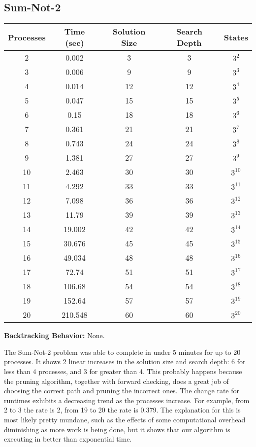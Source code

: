 \subsection{Sum-Not-2}
\begin{center}
\begin{tabular}{|c|c|c|c|c|}
\hline
 Processes & Time (sec) & Solution Size & Search Depth & States \\
\hline
 2 & 0.002 & 3 & 3 & $3^{2}$               \\
 3 & 0.006 & 9 & 9 & $3^{3}$               \\
 4 & 0.014 & 12 & 12 & $3^{4}$             \\
 5 & 0.047 & 15 & 15 & $3^{5}$             \\
 6 & 0.15 & 18 & 18 & $3^{6}$              \\
 7 & 0.361 & 21 & 21 & $3^{7}$              \\
 8 & 0.743 & 24 & 24 & $3^{8}$             \\
 9 & 1.381 & 27 & 27 & $3^{9}$            \\
 10 & 2.463 & 30 & 30 & $3^{10}$          \\
 11 & 4.292 & 33 & 33 & $3^{11}$          \\
 12 & 7.098 & 36 & 36 & $3^{12}$          \\
 13 & 11.79 & 39 & 39 & $3^{13}$          \\
 14 & 19.002 & 42 & 42 & $3^{14}$         \\
 15 & 30.676 & 45 & 45 & $3^{15}$         \\
 16 & 49.034 & 48 & 48 & $3^{16}$         \\
 17 & 72.74 & 51 & 51 & $3^{17}$          \\
 18 & 106.68 & 54 & 54 & $3^{18}$          \\
 19 & 152.64 & 57 & 57 & $3^{19}$         \\
 20 & 210.548 & 60 & 60 & $3^{20}$        \\
\hline
\end{tabular}
\end{center}

{\bf Backtracking Behavior:} None.

The Sum-Not-2 problem was able to complete in under 5 minutes for up to 20 processes.  It shows 2 linear
increases in the solution size and search depth: 6 for less than 4 processes, and 3 for greater than
4.  This probably happens because the pruning algorithm, together with forward checking, does a great job
of choosing the correct path and pruning the incorrect ones.  The change rate for runtimes exhibits a 
decreasing trend as the processes increase.  For example, from 2 to 3 the rate is 2, from 19 to 20 the
rate is 0.379.  The explanation for this is most likely pretty mundane, such as the effects of some
computational overhead diminishing as more work is being done, but it shows that our algorithm is
executing in better than exponential time.   
 
